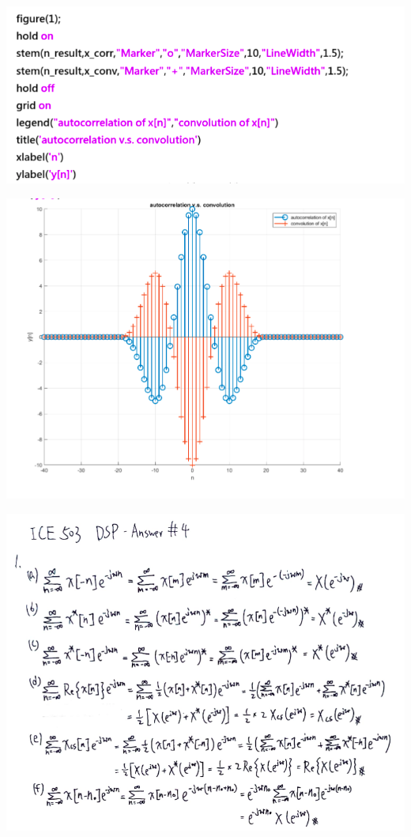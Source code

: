 \documentclass[a4paper]{article}
\begin{document}
	\begin{center}
		\includegraphics[width=1\linewidth]{screenshot030}
	\end{center}
	\begin{center}
		\includegraphics[width=1\linewidth]{screenshot031}
	\end{center}
	
	\newpage
		
	
	
	\begin{center}
		\includegraphics[width=1\linewidth]{screenshot032}
	\end{center}
	
\end{document}
